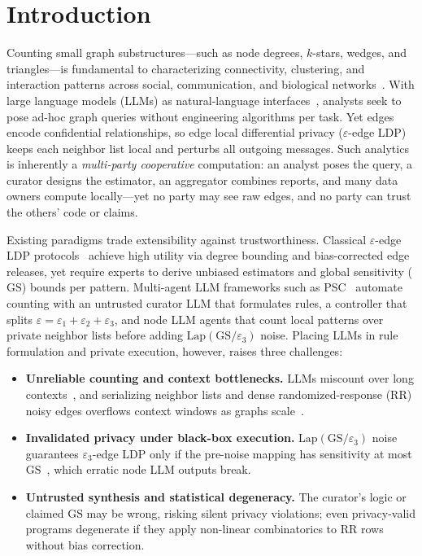 \documentclass[conference]{IEEEtran}
\theoremstyle{ieeeitalic}
\newcommand{\GS}{\mathrm{GS}}
\newcommand{\Lap}{\mathrm{Lap}}
\begin{document}
\section{Introduction}
\label{sec:intro}

Counting small graph substructures---such as node degrees, $k$-stars, wedges, and triangles---is fundamental to characterizing connectivity, clustering, and interaction patterns across social, communication, and biological networks~\cite{imola2021locally,he2025robust}. With large language models (LLMs) as natural-language interfaces~\cite{wang2023can,chen2024graphwiz}, analysts seek to pose ad-hoc graph queries without engineering algorithms per task. Yet edges encode confidential relationships, so edge local differential privacy ($\varepsilon$-edge LDP)~\cite{imola2021locally,imola2022communication} keeps each neighbor list local and perturbs all outgoing messages. Such analytics is inherently a \emph{multi-party cooperative} computation: an analyst poses the query, a curator designs the estimator, an aggregator combines reports, and many data owners compute locally---yet no party may see raw edges, and no party can trust the others' code or claims.

Existing paradigms trade extensibility against trustworthiness. Classical $\varepsilon$-edge LDP protocols~\cite{imola2021locally,imola2022communication,he2025robust,guo2025nam} achieve high utility via degree bounding and bias-corrected edge releases, yet require experts to derive unbiased estimators and global sensitivity ($\GS$) bounds per pattern. Multi-agent LLM frameworks such as PSC~\cite{zhang2026psc} automate counting with an untrusted curator LLM that formulates rules, a controller that splits $\varepsilon = \varepsilon_1 + \varepsilon_2 + \varepsilon_3$, and node LLM agents that count local patterns over private neighbor lists before adding $\Lap(\GS/\varepsilon_3)$ noise. Placing LLMs in rule formulation and private execution, however, raises three challenges:
\begin{itemize}
    \item \textbf{Unreliable counting and context bottlenecks.} LLMs miscount over long contexts~\cite{liu2023lost}, and serializing neighbor lists and dense randomized-response (RR) noisy edges overflows context windows as graphs scale~\cite{zhang2026psc}.
    \item \textbf{Invalidated privacy under black-box execution.} $\Lap(\GS/\varepsilon_3)$ noise guarantees $\varepsilon_3$-edge LDP only if the pre-noise mapping has sensitivity at most $\GS$~\cite{dwork2014algorithmic}, which erratic node LLM outputs break.
    \item \textbf{Untrusted synthesis and statistical degeneracy.} The curator's logic or claimed $\GS$ may be wrong, risking silent privacy violations; even privacy-valid programs degenerate if they apply non-linear combinatorics to RR rows without bias correction.
\end{itemize}
\end{document}
